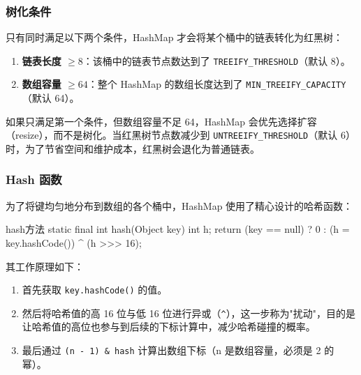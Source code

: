 
\subsubsection{树化条件}
只有同时满足以下两个条件，HashMap 才会将某个桶中的链表转化为红黑树：

\begin{enumerate}
    \item \textbf{链表长度 $\geq 8$}：该桶中的链表节点数达到了 \texttt{TREEIFY\_THRESHOLD}（默认 8）。
    \item \textbf{数组容量 $\geq 64$}：整个 HashMap 的数组长度达到了 \texttt{MIN\_TREEIFY\_CAPACITY}（默认 64）。
\end{enumerate}

如果只满足第一个条件，但数组容量不足 64，HashMap 会优先选择扩容（resize），而不是树化。当红黑树节点数减少到 \texttt{UNTREEIFY\_THRESHOLD}（默认 6）时，为了节省空间和维护成本，红黑树会退化为普通链表。


\subsubsection{Hash 函数}
为了将键均匀地分布到数组的各个桶中，HashMap 使用了精心设计的哈希函数：

\begin{codeblock}[Java]{hash方法}
static final int hash(Object key) {
    int h;
    return (key == null) ? 0 : (h = key.hashCode()) ^ (h >>> 16);
}
\end{codeblock}

其工作原理如下：
\begin{enumerate}
    \item 首先获取 \texttt{key.hashCode()} 的值。
    \item 然后将哈希值的高 16 位与低 16 位进行异或（\texttt{\^{}}），这一步称为"扰动"，目的是让哈希值的高位也参与到后续的下标计算中，减少哈希碰撞的概率。
    \item 最后通过 \texttt{(n - 1) \& hash} 计算出数组下标（n 是数组容量，必须是 2 的幂）。
\end{enumerate}

